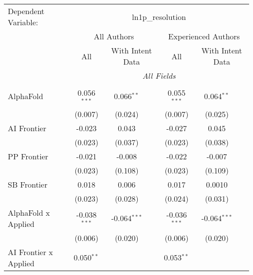 \begingroup
\centering
\begin{tabular}{lcccccc}
   \tabularnewline \midrule \midrule
   Dependent Variable: & \multicolumn{6}{c}{ln1p\_resolution}\\
 & \multicolumn{3}{c}{All Authors} & \multicolumn{3}{c}{Experienced Authors} \\
\cmidrule(lr){2-4} \cmidrule(lr){5-7}
 & \multicolumn{1}{c}{All} & \multicolumn{2}{c}{With Intent Data} & \multicolumn{1}{c}{All} & \multicolumn{2}{c}{With Intent Data} \\
\cmidrule(lr){2-2} \cmidrule(lr){3-4} \cmidrule(lr){5-5} \cmidrule(lr){6-7}
 & \multicolumn{6}{c}{\textit{All Fields}} \\ \\
   AlphaFold                      & 0.056$^{***}$  & 0.066$^{**}$   &                & 0.055$^{***}$  & 0.064$^{**}$   &   \\   
                                  & (0.007)        & (0.024)        &                & (0.007)        & (0.025)        &   \\   
   AI Frontier                    & -0.023         & 0.043          &                & -0.027         & 0.045          &   \\   
                                  & (0.023)        & (0.037)        &                & (0.023)        & (0.038)        &   \\   
   PP Frontier                    & -0.021         & -0.008         &                & -0.022         & -0.007         &   \\   
                                  & (0.023)        & (0.108)        &                & (0.023)        & (0.109)        &   \\   
   SB Frontier                    & 0.018          & 0.006          &                & 0.017          & 0.0010         &   \\   
                                  & (0.023)        & (0.028)        &                & (0.024)        & (0.031)        &   \\   
   AlphaFold x Applied            & -0.038$^{***}$ & -0.064$^{***}$ &                & -0.036$^{***}$ & -0.064$^{***}$ &   \\   
                                  & (0.006)        & (0.020)        &                & (0.006)        & (0.020)        &   \\   
   AI Frontier x Applied          & 0.050$^{**}$   &                &                & 0.053$^{**}$   &                &   \\   

\end{tabular}
